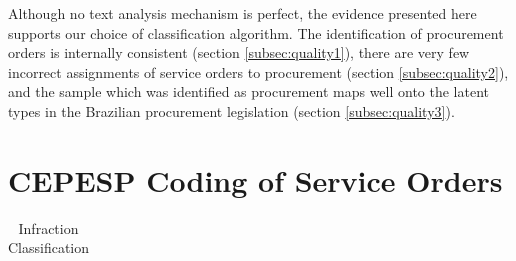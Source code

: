 \documentclass[11pt]{article}
\begin{document}
Although no text analysis mechanism is perfect, the evidence presented here supports our choice of classification algorithm. The identification of procurement orders is internally consistent (section \ref{subsec:quality1}), there are very few incorrect assignments of service orders to procurement (section \ref{subsec:quality2}), and the sample which was identified as procurement maps well onto the latent types in the Brazilian procurement legislation (section \ref{subsec:quality3}).
\newpage

\section{CEPESP Coding of Service Orders}\label{sec:appendixB}

\begin{table}[!htbp]
  \caption{\label{tab:codes} Infraction Classification}
  \centering
  \scriptsize
  \begin{tabular}{r|l}
  \hline


\end{tabular}
\end{table}
\end{document}
